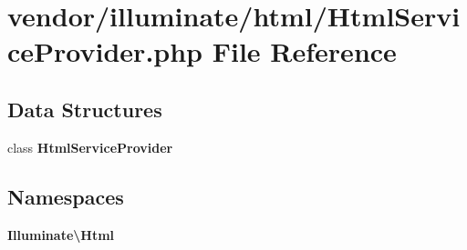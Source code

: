\section{vendor/illuminate/html/\+Html\+Service\+Provider.php File Reference}
\label{_html_service_provider_8php}
\subsection*{Data Structures}
\begin{DoxyCompactItemize}
\item 
class {\bf Html\+Service\+Provider}
\end{DoxyCompactItemize}
\subsection*{Namespaces}
\begin{DoxyCompactItemize}
\item 
 {\bf Illuminate\textbackslash{}\+Html}
\end{DoxyCompactItemize}
